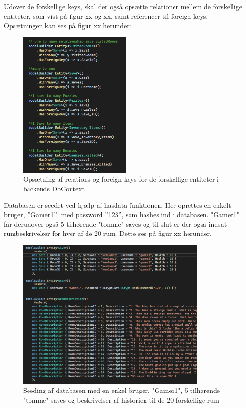 Udover de forskellige keys, skal der også opsætte relationer mellem de forskellige entiteter, som vist på figur xx og xx, samt referencer til foreign keys. 
Opsætningen kan ses på figur xx herunder: 

\begin{figure}[H]
\centering
\includegraphics[width = 0.5\textwidth]{02-Body/Images/DAL-Database/DbRelations.PNG}
\caption{Opsætning af relations og foreign keys for de forskellige entiteter i backends DbContext}
\label{fig:DbRelations}
\end{figure}

Databasen er seedet ved hjælp af hasdata funktionen. Her oprettes en enkelt bruger, ”Gamer1”, med password ”123”, som hashes ind i databasen. "Gamer1" får derudover også 5 tilhørende "tomme" saves og til slut er der også indsat rumbeskrivelser for hver af de 20 rum. Dette ses på figur xx herunder.

\begin{figure}[H]
\centering
\includegraphics[width = 0.85\textwidth]{02-Body/Images/DAL-Database/DbSeeding.PNG}
\caption{Seeding af databasen med en enkel bruger, "Gamer1", 5 tilhørende "tomme" saves og beskrivelser af historien til de 20 forskellige rum}
\label{fig:DbSeeding}
\end{figure}